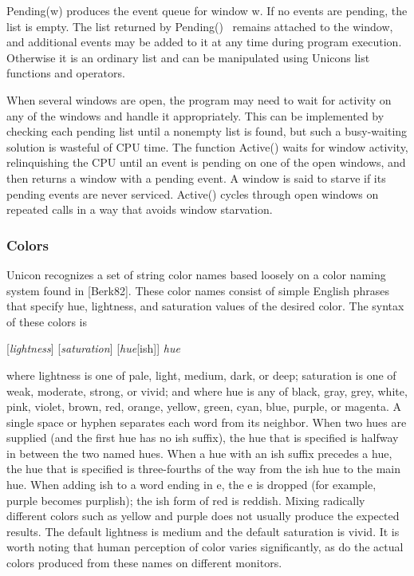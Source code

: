 Pending(w) produces the event queue for window w. If no events are
pending, the list is empty. The list returned by Pending() \ remains
attached to the window, and additional events may be added to it at any
time during program execution. Otherwise it is an ordinary list and
can be manipulated using Unicon{\textquotesingle}s list functions and
operators.

When several windows are open, the program may need to wait for activity
on any of the windows and handle it appropriately. This can be
implemented by checking each pending list until a nonempty list is
found, but such a busy-waiting solution is wasteful of CPU time. The
function Active() waits for window activity, relinquishing the CPU
until an event is pending on one of the open windows, and then returns
a window with a pending event. A window is said to starve if its
pending events are never serviced. Active() cycles through open windows
on repeated calls in a way that avoids window starvation.

\subsubsection{Colors}

Unicon recognizes a set of string color names based loosely on a color
naming system found in [Berk82]. These color names consist of simple
English phrases that specify hue, lightness, and saturation values of
the desired color. The syntax of these colors is

[\textit{lightness}] [\textit{saturation}] [\textit{hue}[ish]]
\textit{hue}

where lightness is one of pale, light, medium, dark, or deep; saturation
is one of weak, moderate, strong, or vivid; and where hue is any of
black, gray, grey, white, pink, violet, brown, red, orange, yellow,
green, cyan, blue, purple, or magenta. A single space or hyphen
separates each word from its neighbor. When two hues are supplied
(and the first hue has no ish suffix), the hue that is specified is
halfway in between the two named hues. When a hue with an ish suffix
precedes a hue, the hue that is specified is three-fourths of the way
from the ish hue to the main hue. When adding ish to a word ending in
e, the e is dropped (for example, purple becomes purplish); the ish
form of red is reddish. Mixing radically different colors such as
yellow and purple does not usually produce the expected results. The
default lightness is medium and the default saturation is vivid. It
is worth noting that human perception of color varies significantly, as
do the actual colors produced from these names on different monitors.

